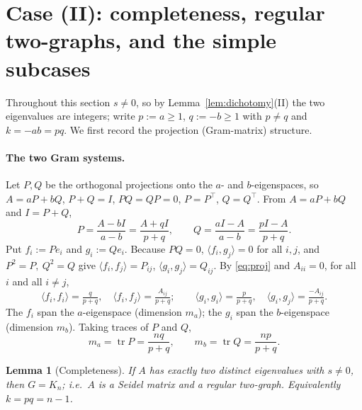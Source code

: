 \documentclass{amsart}
\newtheorem{lemma}{Lemma}
\theoremstyle{definition}
\begin{document}
\section{Case (II): completeness, regular two-graphs, and the simple
subcases}\label{sec:complete}

Throughout this section $s\ne0$, so by Lemma~\ref{lem:dichotomy}(II) the two
eigenvalues are integers; write $p:=a\ge1$, $q:=-b\ge1$ with $p\ne q$ and
$k=-ab=pq$. We first record the projection (Gram-matrix) structure.

\paragraph{The two Gram systems.}
Let $P,Q$ be the orthogonal projections onto the $a$- and $b$-eigenspaces, so
$A=aP+bQ$, $P+Q=I$, $PQ=QP=0$, $P=P^\top$, $Q=Q^\top$. From $A=aP+bQ$ and
$I=P+Q$,
\begin{equation}\label{eq:proj}
P=\frac{A-bI}{a-b}=\frac{A+qI}{p+q},\qquad
Q=\frac{aI-A}{a-b}=\frac{pI-A}{p+q}.
\end{equation}
Put $f_i:=Pe_i$ and $g_i:=Qe_i$. Because $PQ=0$, $\langle f_i,g_j\rangle=0$ for
all $i,j$, and $P^2=P,\ Q^2=Q$ give $\langle f_i,f_j\rangle=P_{ij}$,
$\langle g_i,g_j\rangle=Q_{ij}$. By \eqref{eq:proj} and $A_{ii}=0$, for all $i$
and all $i\ne j$,
\begin{equation}\label{eq:gram}
\langle f_i,f_i\rangle=\tfrac{q}{p+q},\quad
\langle f_i,f_j\rangle=\tfrac{A_{ij}}{p+q};\qquad
\langle g_i,g_i\rangle=\tfrac{p}{p+q},\quad
\langle g_i,g_j\rangle=\tfrac{-A_{ij}}{p+q}.
\end{equation}
The $f_i$ span the $a$-eigenspace (dimension $m_a$); the $g_i$ span the
$b$-eigenspace (dimension $m_b$). Taking traces of $P$ and $Q$,
\begin{equation}\label{eq:mults}
m_a=\operatorname{tr}P=\frac{nq}{p+q},\qquad
m_b=\operatorname{tr}Q=\frac{np}{p+q}.
\end{equation}

\begin{lemma}[Completeness]\label{lem:complete}
If $A$ has exactly two distinct eigenvalues with $s\ne0$, then $G=K_n$; i.e.\
$A$ is a Seidel matrix and a regular two-graph. Equivalently $k=pq=n-1$.
\end{lemma}
\end{document}
